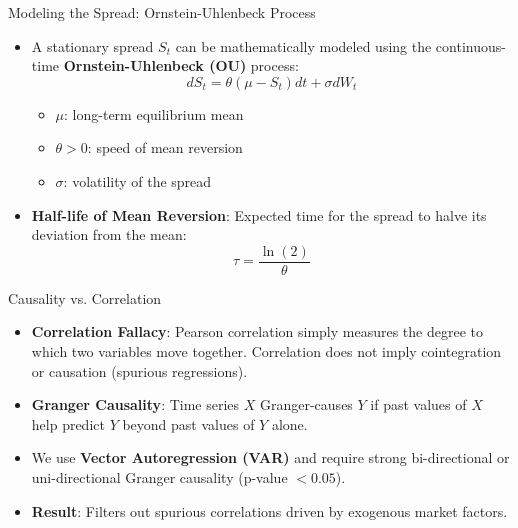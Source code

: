 \documentclass[11pt,aspectratio=169]{beamer}
\begin{document}
\begin{frame}{Modeling the Spread: Ornstein-Uhlenbeck Process}
    \begin{itemize}
        \item A stationary spread $S_t$ can be mathematically modeled using the continuous-time \textbf{Ornstein-Uhlenbeck (OU)} process:
        \begin{equation*}
            dS_t = \theta (\mu - S_t) dt + \sigma dW_t
        \end{equation*}
        \begin{itemize}
            \item $\mu$: long-term equilibrium mean
            \item $\theta > 0$: speed of mean reversion
            \item $\sigma$: volatility of the spread
        \end{itemize}
        \vspace{0.2cm}
        \item \textbf{Half-life of Mean Reversion}: Expected time for the spread to halve its deviation from the mean:
        \begin{equation*}
            \tau = \frac{\ln(2)}{\theta}
        \end{equation*}
    \end{itemize}
\end{frame}

\begin{frame}{Causality vs. Correlation}
    \begin{itemize}
        \item \textbf{Correlation Fallacy}: Pearson correlation simply measures the degree to which two variables move together. Correlation does not imply cointegration or causation (spurious regressions).
        \vspace{0.3cm}
        \item \textbf{Granger Causality}: Time series $X$ Granger-causes $Y$ if past values of $X$ help predict $Y$ beyond past values of $Y$ alone.
        \item We use \textbf{Vector Autoregression (VAR)} and require strong bi-directional or uni-directional Granger causality (p-value $< 0.05$).
        \item \textbf{Result}: Filters out spurious correlations driven by exogenous market factors.
    \end{itemize}
\end{frame}
\end{document}
